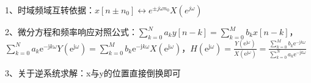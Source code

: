 1、时域频域互转依据：$x[n \pm n_0] \leftrightarrow e^{\pm j \omega n_0} X\left(e^{j \omega }\right) $

2、微分方程和频率响应对照公式：$\sum_{k=0}^{N} a_{k} y[n-k]=\sum_{k=0}^{M} b_{k} x[n-k]$，$\sum_{k=0}^{N} a_{k} \mathrm{e}^{-\mathrm{j} k \omega} Y\left(\mathrm{e}^{\mathrm{j} \omega}\right)=\sum_{k=0}^{M} b_{k} \mathrm{e}^{-\mathrm{j} k \omega} X\left(\mathrm{e}^{\mathrm{j} \omega}\right)$，$H\left(\mathrm{e}^{\mathrm{j} \omega}\right)=\frac{Y\left(\mathrm{e}^{\mathrm{j} \omega}\right)}{X\left(\mathrm{e}^{\mathrm{j} \omega}\right)}=\frac{\sum_{k=0}^{M} b_{k} \mathrm{e}^{-\mathrm{j} k \omega}}{\sum_{k=0}^{N} a_{k} \mathrm{e}^{-\mathrm{j} k \omega}}$

3、关于逆系统求解：x与y的位置直接倒换即可



